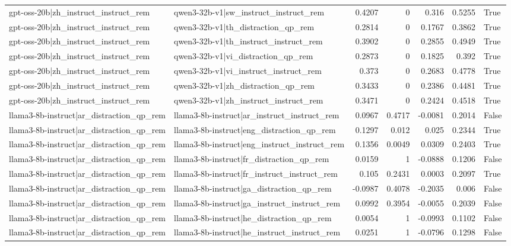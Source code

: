 \begin{table}
\begin{tabular}{l l r r r r l}
gpt-oss-20b|zh_instruct_instruct_rem & qwen3-32b-v1|sw_instruct_instruct_rem & 0.4207 & 0 & 0.316 & 0.5255 & True \\
gpt-oss-20b|zh_instruct_instruct_rem & qwen3-32b-v1|th_distraction_qp_rem & 0.2814 & 0 & 0.1767 & 0.3862 & True \\
gpt-oss-20b|zh_instruct_instruct_rem & qwen3-32b-v1|th_instruct_instruct_rem & 0.3902 & 0 & 0.2855 & 0.4949 & True \\
gpt-oss-20b|zh_instruct_instruct_rem & qwen3-32b-v1|vi_distraction_qp_rem & 0.2873 & 0 & 0.1825 & 0.392 & True \\
gpt-oss-20b|zh_instruct_instruct_rem & qwen3-32b-v1|vi_instruct_instruct_rem & 0.373 & 0 & 0.2683 & 0.4778 & True \\
gpt-oss-20b|zh_instruct_instruct_rem & qwen3-32b-v1|zh_distraction_qp_rem & 0.3433 & 0 & 0.2386 & 0.4481 & True \\
gpt-oss-20b|zh_instruct_instruct_rem & qwen3-32b-v1|zh_instruct_instruct_rem & 0.3471 & 0 & 0.2424 & 0.4518 & True \\
llama3-8b-instruct|ar_distraction_qp_rem & llama3-8b-instruct|ar_instruct_instruct_rem & 0.0967 & 0.4717 & -0.0081 & 0.2014 & False \\
llama3-8b-instruct|ar_distraction_qp_rem & llama3-8b-instruct|eng_distraction_qp_rem & 0.1297 & 0.012 & 0.025 & 0.2344 & True \\
llama3-8b-instruct|ar_distraction_qp_rem & llama3-8b-instruct|eng_instruct_instruct_rem & 0.1356 & 0.0049 & 0.0309 & 0.2403 & True \\
llama3-8b-instruct|ar_distraction_qp_rem & llama3-8b-instruct|fr_distraction_qp_rem & 0.0159 & 1 & -0.0888 & 0.1206 & False \\
llama3-8b-instruct|ar_distraction_qp_rem & llama3-8b-instruct|fr_instruct_instruct_rem & 0.105 & 0.2431 & 0.0003 & 0.2097 & True \\
llama3-8b-instruct|ar_distraction_qp_rem & llama3-8b-instruct|ga_distraction_qp_rem & -0.0987 & 0.4078 & -0.2035 & 0.006 & False \\
llama3-8b-instruct|ar_distraction_qp_rem & llama3-8b-instruct|ga_instruct_instruct_rem & 0.0992 & 0.3954 & -0.0055 & 0.2039 & False \\
llama3-8b-instruct|ar_distraction_qp_rem & llama3-8b-instruct|he_distraction_qp_rem & 0.0054 & 1 & -0.0993 & 0.1102 & False \\
llama3-8b-instruct|ar_distraction_qp_rem & llama3-8b-instruct|he_instruct_instruct_rem & 0.0251 & 1 & -0.0796 & 0.1298 & False \\

\end{tabular}
\end{table}
